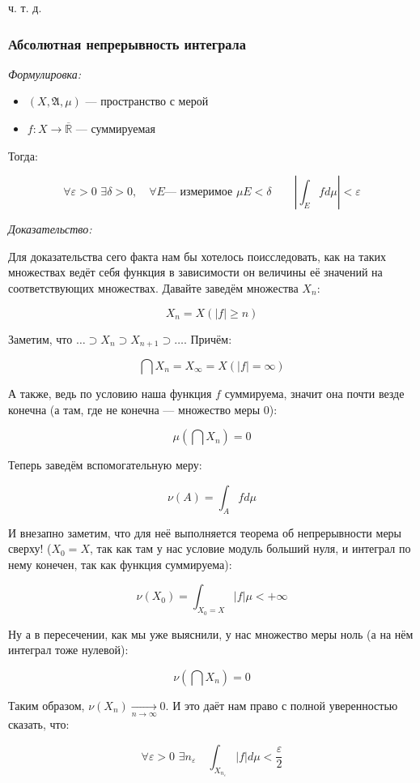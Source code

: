 \documentclass{article}
\def\dbl{\,\,}
\def\rinf{\overline{\mathbb{R}}}
\def\goesto#1{\underset{#1}{\longrightarrow}}
\def\toinf#1{\goesto{#1 \rightarrow \infty}}
\def\ntoinf{\toinf{n}}
\begin{document}
ч. т. д. 

\subsubsection{Абсолютная непрерывность интеграла}
\textit{Формулировка:}

\begin{itemize}
    \item $(X, \mathfrak{A}, \mu)$ --- пространство с мерой
    \item $f: X \rightarrow \rinf$ --- суммируемая
\end{itemize}

Тогда:

\[\forall \varepsilon > 0 \dbl \exists \delta > 0, \quad \forall E\text{--- измеримое} \dbl \mu E < \delta \qquad \left|\int_{E} f d \mu\right| < \varepsilon\]

\textit{Доказательство:}

Для доказательства сего факта нам бы хотелось поисследовать, как на таких множествах ведёт себя функция в зависимости он величины её значений на соответствующих множествах. Давайте заведём множества $X_n$:

\[X_n = X(|f| \ge n)\]

Заметим, что $\ldots \supset X_n \supset X_{n + 1} \supset \ldots$. Причём:

\[\bigcap X_n = X_{\infty} = X(|f| = \infty)\]

А также, ведь по условию наша функция $f$ суммируема, значит она почти везде конечна (а там, где не конечна --- множество меры 0):

\[\mu \left( \bigcap X_n \right) = 0\]

Теперь заведём вспомогательную меру:

\[ \nu(A) = \int_{A} f d\mu\]

И внезапно заметим, что для неё выполняется теорема об непрерывности меры сверху! ($X_0 = X$, так как там у нас условие модуль больший нуля, и интеграл по нему конечен, так как функция суммируема):

\[\nu(X_0) = \int_{X_0 = X} |f| \mu < +\infty\]

Ну а в пересечении, как мы уже выяснили, у нас множество меры ноль (а на нём интеграл тоже нулевой):

\[\nu\left( \bigcap X_n \right) = 0\]

Таким образом, $\nu(X_n) \ntoinf 0$. И это даёт нам право с полной уверенностью сказать, что:

\[\forall \varepsilon > 0 \dbl \exists n_\varepsilon \quad \int_{X_{n_\varepsilon}} |f| d\mu < \frac{\varepsilon}{2}\]
\end{document}
